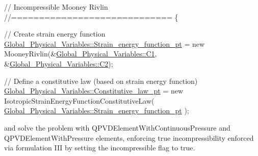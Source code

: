 \begin{DoxyCodeInclude}

 
 \textcolor{comment}{// Incompressible Mooney Rivlin}
 \textcolor{comment}{//=============================}
 \{

  \textcolor{comment}{// Create strain energy function}
  \hyperlink{namespaceGlobal__Physical__Variables_a73135f793690b4386bf83bbefc7bf310}{Global\_Physical\_Variables::Strain\_energy\_function\_pt} 
      = 
   \textcolor{keyword}{new} MooneyRivlin(&\hyperlink{namespaceGlobal__Physical__Variables_a849754fa7155c1a31481674ce4845658}{Global\_Physical\_Variables::C1},
                    &\hyperlink{namespaceGlobal__Physical__Variables_af9defd1b5745cce50d2c386b3ac0e0ae}{Global\_Physical\_Variables::C2});
  
  \textcolor{comment}{// Define a constitutive law (based on strain energy function)}
  \hyperlink{namespaceGlobal__Physical__Variables_a2a37fb040c832ee7a086bb13bb02a100}{Global\_Physical\_Variables::Constitutive\_law\_pt} = 
   \textcolor{keyword}{new} IsotropicStrainEnergyFunctionConstitutiveLaw(
    \hyperlink{namespaceGlobal__Physical__Variables_a73135f793690b4386bf83bbefc7bf310}{Global\_Physical\_Variables::Strain\_energy\_function\_pt}
      );

\end{DoxyCodeInclude}


and solve the problem with {\ttfamily Q\+P\+V\+D\+Element\+With\+Continuous\+Pressure} and {\ttfamily Q\+P\+V\+D\+Element\+With\+Pressure} elements, enforcing true incompressibility enforced via formulation I\+II by setting the {\ttfamily incompressible} flag to true.


